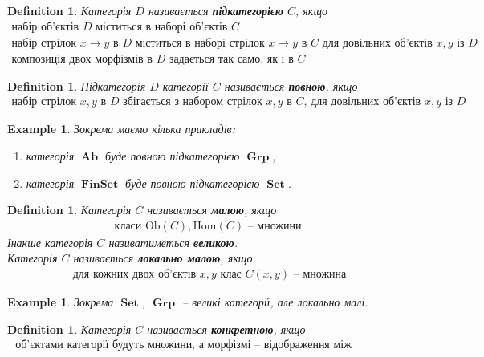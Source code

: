 \documentclass[a4paper, 10pt]{article}
\theoremstyle{theoremdd}
\newtheorem{definition}[theorem]{Definition}
\newtheorem{example}[theorem]{Example}
\DeclareMathOperator{\Set}{\textbf{Set}}
\DeclareMathOperator{\FinSet}{\textbf{FinSet}}
\DeclareMathOperator{\Grp}{\textbf{Grp}}
\DeclareMathOperator{\Ab}{\textbf{Ab}}
\begin{document}
\begin{definition}
Категорія $D$ називається \textbf{підкатегорією} $C$, якщо
\begin{align*}
\text{набір об'єктів $D$ міститься в наборі об'єктів $C$} \\
\text{набір стрілок $x \to y$ в $D$ міститься в наборі стрілок $x \to y$ в $C$ для довільних об'єктів $x,y$ із $D$} \\
\text{композиція двох морфізмів в $D$ задається так само, як і в $C$}
\end{align*}
\end{definition}

\begin{definition}
Підкатегорія $D$ категорії $C$ називається \textbf{повною}, якщо
\begin{align*}
\text{набір стрілок $x,y$ в $D$ збігається з набором стрілок $x,y$ в $C$, для довільних об'єктів $x,y$ із $D$}
\end{align*}
\end{definition}

\begin{example}
Зокрема маємо кілька прикладів:
\begin{enumerate}[nosep,wide=0pt,label={\arabic*)}]
\item категорія $\Ab$ буде повною підкатегорією $\Grp$;
\item категорія $\FinSet$ буде повною підкатегорією $\Set$.
\end{enumerate}
\end{example}

\begin{definition}
Категорія $C$ називається \textbf{малою}, якщо
\begin{align*}
\text{класи } \text{Ob}(C), \text{Hom}(C) \text{ -- множини.}
\end{align*}
Інакше категорія $C$ називатиметься \textbf{великою}.\\
Категорія $C$ називається \textbf{локально малою}, якщо
\begin{align*}
\text{для кожних двох об'єктів } x,y \text{ клас } C(x,y) \text{ -- множина}
\end{align*}
\end{definition}

\begin{example}
Зокрема $\Set$, $\Grp$ -- великі категорії, але локально малі.
\end{example}

\begin{definition}
Категорія $C$ називається \textbf{конкретною}, якщо
\begin{align*}
\text{ об'єктами категорії будуть множини, а морфізмі -- відображення між множинами, що зберігає "структуру".}
\end{align*}
\end{definition}
\end{document}
